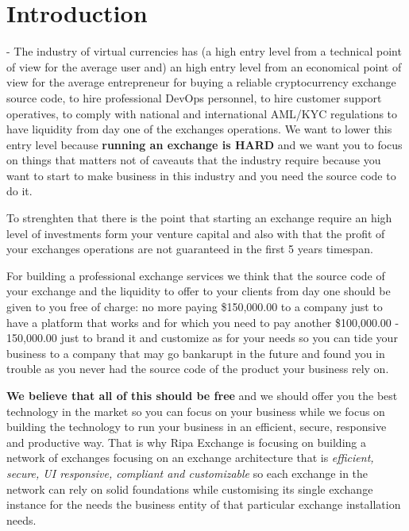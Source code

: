 \documentclass[11pt,fleqn]{book} %
\begin{document}



\chapter{Introduction}
- The industry of virtual currencies has (a high entry level from a technical point of view for the average user
and) an high entry level from an economical point of view for the average entrepreneur for buying a reliable cryptocurrency 
exchange source code, to hire professional DevOps personnel, to hire customer support operatives, to comply with national and 
international AML/KYC regulations to have liquidity from day one of the exchanges operations. We want to lower this entry level because
\textbf{running an exchange is HARD} and we want you to focus on things that matters not of caveauts that the industry require because
you want to start to make business in this industry and you need the source code to do it.

To strenghten that there is the point that starting an exchange require an high level of investments form your venture capital 
and also with that the profit of your exchanges operations are not guaranteed in the first 5 years timespan.

For building a professional exchange services we think that the source code of your exchange and the liquidity to offer to your clients
from day one should be given to you free of charge: no more paying \$150,000.00 to a company just to have a platform that works and for
which you need to pay another \$100,000.00 - 150,000.00 just to brand it and customize as for your needs so you can tide your 
business to a company that may go bankarupt in the future and found you in trouble as you never had the source code of the product
your business rely on.

\textbf{We believe that all of this should be free} and we should offer you the best technology in the market so you can focus on your business
while we focus on building the technology to run your business in an efficient, secure, responsive and productive way. That is why Ripa Exchange 
is focusing on building a network of exchanges focusing on an exchange architecture that is \textit{efficient, secure, UI responsive, compliant and customizable}
so each exchange in the network can rely on solid foundations while customising its single exchange instance for the needs 
the business entity of that particular exchange installation needs.
\end{document}
